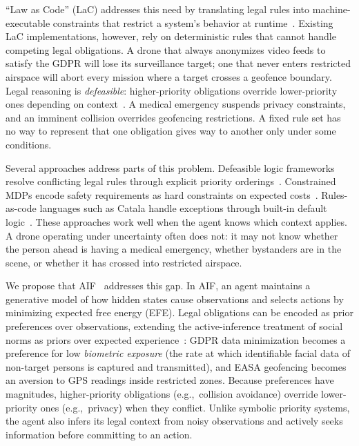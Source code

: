 \documentclass[10pt,twocolumn]{article}
\begin{document}
``Law as Code'' (LaC) addresses this need by translating legal rules into machine-executable constraints that restrict a system's behavior at runtime~\cite{diver2021, surden2012}. Existing LaC implementations, however, rely on deterministic rules that cannot handle competing legal obligations. A drone that always anonymizes video feeds to satisfy the GDPR will lose its surveillance target; one that never enters restricted airspace will abort every mission where a target crosses a geofence boundary. Legal reasoning is \textit{defeasible}: higher-priority obligations override lower-priority ones depending on context~\cite{prakken2015}. A medical emergency suspends privacy constraints, and an imminent collision overrides geofencing restrictions. A fixed rule set has no way to represent that one obligation gives way to another only under some conditions.

Several approaches address parts of this problem. Defeasible logic frameworks resolve conflicting legal rules through explicit priority orderings~\cite{prakken2015}. Constrained MDPs encode safety requirements as hard constraints on expected costs~\cite{garcia2015}. Rules-as-code languages such as Catala handle exceptions through built-in default logic~\cite{merigoux2021}. These approaches work well when the agent knows which context applies. A drone operating under uncertainty often does not: it may not know whether the person ahead is having a medical emergency, whether bystanders are in the scene, or whether it has crossed into restricted airspace.

We propose that AIF~\cite{friston2017, dacostaAIF2020, parr2022} addresses this gap. In AIF, an agent maintains a generative model of how hidden states cause observations and selects actions by minimizing expected free energy (EFE). Legal obligations can be encoded as prior preferences over observations, extending the active-inference treatment of social norms as priors over expected experience~\cite{constant2019}: GDPR data minimization becomes a preference for low \textit{biometric exposure} (the rate at which identifiable facial data of non-target persons is captured and transmitted), and EASA geofencing becomes an aversion to GPS readings inside restricted zones. Because preferences have magnitudes, higher-priority obligations (e.g.,~collision avoidance) override lower-priority ones (e.g.,~privacy) when they conflict. Unlike symbolic priority systems, the agent also infers its legal context from noisy observations and actively seeks information before committing to an action.
\end{document}

